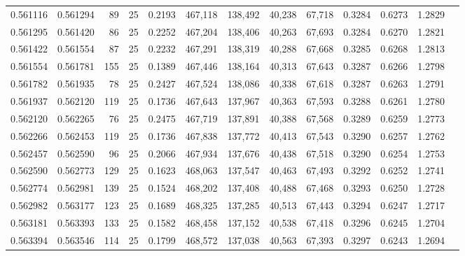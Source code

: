 \begin{tabular}{rrrrrrrrrrrrr}
0.561116 & 0.561294 &    89 &  25 &                                     0.2193 & 467,118 & 138,492 &  40,238 &  67,718 & 0.3284 & 0.6273 & 1.2829 \\
0.561295 & 0.561420 &    86 &  25 &                                     0.2252 & 467,204 & 138,406 &  40,263 &  67,693 & 0.3284 & 0.6270 & 1.2821 \\
0.561422 & 0.561554 &    87 &  25 &                                     0.2232 & 467,291 & 138,319 &  40,288 &  67,668 & 0.3285 & 0.6268 & 1.2813 \\
0.561554 & 0.561781 &   155 &  25 &                                     0.1389 & 467,446 & 138,164 &  40,313 &  67,643 & 0.3287 & 0.6266 & 1.2798 \\
0.561782 & 0.561935 &    78 &  25 &                                     0.2427 & 467,524 & 138,086 &  40,338 &  67,618 & 0.3287 & 0.6263 & 1.2791 \\
0.561937 & 0.562120 &   119 &  25 &                                     0.1736 & 467,643 & 137,967 &  40,363 &  67,593 & 0.3288 & 0.6261 & 1.2780 \\
0.562120 & 0.562265 &    76 &  25 &                                     0.2475 & 467,719 & 137,891 &  40,388 &  67,568 & 0.3289 & 0.6259 & 1.2773 \\
0.562266 & 0.562453 &   119 &  25 &                                     0.1736 & 467,838 & 137,772 &  40,413 &  67,543 & 0.3290 & 0.6257 & 1.2762 \\
0.562457 & 0.562590 &    96 &  25 &                                     0.2066 & 467,934 & 137,676 &  40,438 &  67,518 & 0.3290 & 0.6254 & 1.2753 \\
0.562590 & 0.562773 &   129 &  25 &                                     0.1623 & 468,063 & 137,547 &  40,463 &  67,493 & 0.3292 & 0.6252 & 1.2741 \\
0.562774 & 0.562981 &   139 &  25 &                                     0.1524 & 468,202 & 137,408 &  40,488 &  67,468 & 0.3293 & 0.6250 & 1.2728 \\
0.562982 & 0.563177 &   123 &  25 &                                     0.1689 & 468,325 & 137,285 &  40,513 &  67,443 & 0.3294 & 0.6247 & 1.2717 \\
0.563181 & 0.563393 &   133 &  25 &                                     0.1582 & 468,458 & 137,152 &  40,538 &  67,418 & 0.3296 & 0.6245 & 1.2704 \\
0.563394 & 0.563546 &   114 &  25 &                                     0.1799 & 468,572 & 137,038 &  40,563 &  67,393 & 0.3297 & 0.6243 & 1.2694 \\

\end{tabular}
